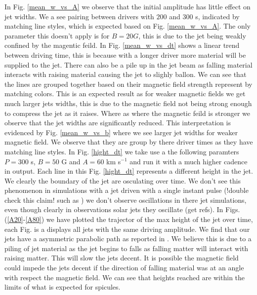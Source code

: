 \documentclass[12pt]{ociamthesis}
\newcommand{\fref}[1]{Fig. \eqref{#1}}
\newcommand{\mfig}[4]{
  \begin{figure}
  \begin{center}
  \texttt{[image: \#2]}
  \caption{#3}
  \label{#4}
  \end{center}
  \end{figure}}
\begin{document}
\par In \fref{mean_w_vs_A} we observe that the initial amplitude has little effect on jet widths. We a see pairing between drivers with $200$ and $300$ s, indicated by matching line styles, which is expected based on \fref{mean_w_vs_A}. The only parameter this doesn't apply is for $B=20 G$, this is due to the jet being weakly confined by the magentic feild. In \fref{mean_w_vs_dt} shows a linear trend between driving time, this is because with a longer driver more material will be supplied to the jet. There can also be a pile up in the jet beam as falling material interacts with raising material causing the jet to slighly ballon. We can see that the lines are grouped together based on their magnetic field strength represent by matching colors. This is an expected result as for weaker magnetic fields we get much larger jets widths, this is due to the magnetic field not being strong enough to compress the jet as it raises. Where as where the magnetic feild is stronger we observe that the jet widths are significantly reduced. This interpretation is evidenced by \fref{mean_w_vs_b} where we see larger jet widths for weaker magnetic field. We observe that they are group by there driver times as they have matching line styles. In \fref{hight_dt} we take use a the following paramters $P=300$ s, $B=50$ G and $A=60$ km s$^{-1}$ and run it with a much higher cadence in output. Each line in this \fref{hight_dt} represents a different height in the jet. We clearly the boundary of the jet are osculating over time. We don't see this phenomenon in simulations with a jet driven with a single instant pulse (!double check this claim! such as \citep{kuz2017ApJ,Singh2019}) we don't observe oscillations in there jet simulations, even though clearly in observations solar jets they oscillate (get refs). In Figs. (\ref{A20}-\ref{A80}) we have plotted the trajector of the max height of the jet over time, each Fig. is a displays all jets with the same driving amplitude. We find that our jets have a asymmetric parabolic path as reported in \cite{Singh2019}. We believe this is due to a piling of jet material as the jet begins to falls as falling matter will interact with raising matter. This will slow the jets decent. It is possible the magnetic field could impede the jets decent if the direction of falling material was at an angle with respect the magnetic field. We can see that heights reached are within the limits of what is expected for spicules. 
\end{document}
